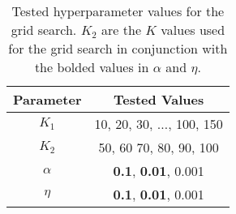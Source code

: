 \begin{table}[t]
	\centering
	\caption{Tested hyperparameter values for the grid search. $K_2$ are the $K$ values used for the grid search in conjunction with the bolded values in $\alpha$ and $\eta$.}
	\begin{tabular}{c|c}
		Parameter & Tested Values\\
		\midrule
		$K_1$ & 10, 20, 30, $\dots$, 100, 150\\
		$K_2$ & 50, 60 70, 80, 90, 100\\
		$\alpha$ & \textbf{0.1}, \textbf{0.01}, 0.001\\
		$\eta$ & \textbf{0.1}, \textbf{0.01}, 0.001\\
	\end{tabular}
	\label{tab:gridsearch}
\end{table}
